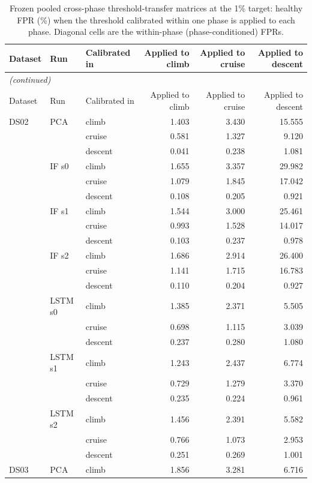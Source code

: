\begin{footnotesize}
\begin{longtable}{lllrrr}
\caption{Frozen pooled cross-phase threshold-transfer matrices at the 1\% target: healthy FPR (\%) when the threshold calibrated within one phase is applied to each phase. Diagonal cells are the within-phase (phase-conditioned) FPRs.}\label{tab:s6_transfer}\\
\toprule
Dataset & Run & Calibrated in & Applied to climb & Applied to cruise & Applied to descent \\
\midrule
\endfirsthead
\multicolumn{6}{l}{\emph{(continued)}}\\
\toprule
Dataset & Run & Calibrated in & Applied to climb & Applied to cruise & Applied to descent \\
\midrule
\endhead
\bottomrule
\endfoot
DS02 & PCA & climb & 1.403 & 3.430 & 15.555 \\
 &  & cruise & 0.581 & 1.327 & 9.120 \\
 &  & descent & 0.041 & 0.238 & 1.081 \\
 & IF s0 & climb & 1.655 & 3.357 & 29.982 \\
 &  & cruise & 1.079 & 1.845 & 17.042 \\
 &  & descent & 0.108 & 0.205 & 0.921 \\
 & IF s1 & climb & 1.544 & 3.000 & 25.461 \\
 &  & cruise & 0.993 & 1.528 & 14.017 \\
 &  & descent & 0.103 & 0.237 & 0.978 \\
 & IF s2 & climb & 1.686 & 2.914 & 26.400 \\
 &  & cruise & 1.141 & 1.715 & 16.783 \\
 &  & descent & 0.110 & 0.204 & 0.927 \\
 & LSTM s0 & climb & 1.385 & 2.371 & 5.505 \\
 &  & cruise & 0.698 & 1.115 & 3.039 \\
 &  & descent & 0.237 & 0.280 & 1.080 \\
 & LSTM s1 & climb & 1.243 & 2.437 & 6.774 \\
 &  & cruise & 0.729 & 1.279 & 3.370 \\
 &  & descent & 0.235 & 0.224 & 0.961 \\
 & LSTM s2 & climb & 1.456 & 2.391 & 5.582 \\
 &  & cruise & 0.766 & 1.073 & 2.953 \\
 &  & descent & 0.251 & 0.269 & 1.001 \\
\midrule
DS03 & PCA & climb & 1.856 & 3.281 & 6.716 \\

\end{longtable}
\end{footnotesize}
